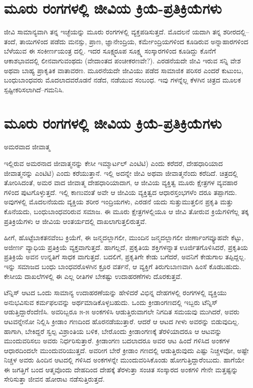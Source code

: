 \section{ಮೂರು ರಂಗಗಳಲ್ಲಿ ಜೀವಿಯ ಕ್ರಿಯೆ-ಪ್ರತಿಕ್ರಿಯೆಗಳು}

ಜೀವಿ ಸಾಮಾನ್ಯವಾಗಿ ತನ್ನ ಇಚ್ಛೆಯನ್ನು ಮೂರು ರಂಗಗಳಲ್ಲಿ ವ್ಯಕ್ತಪಡಿಸುತ್ತದೆ. ಮೊದಲನೆ ಯದಾಗಿ ತನ್ನ ಶರೀರದಲ್ಲಿ–ತಂದೆ, ತಾಯಿಗಳಿಂದ ಪಡೆದು ಮನಸ್ಸು, ಪ್ರಾಣ, ಜ್ಞಾನೇಂದ್ರಿಯ, ಕರ್ಮೇಂದ್ರಿಯಗಳಿಂದ ಕೂಡಿರುವ ಅನ್ನಾಹಾರಗಳಿಂದ ಬೆಳೆಯುವ ಈ ಸಂಕೀರ್ಣಯಂತ್ರ ದಲ್ಲಿ. ಇದರ ಸೂಕ್ಷ್ಮರೂಪ ಸೂಕ್ಷ್ಮ ಸಂಸ್ಕಾರಗಳಿಂದ ಕೂಡಿದ್ದು ಕೊನೆಗೆ ಆಕಾಶಭಾವದಲ್ಲಿ ಲೀನವಾಗುವಂಥದು (ವೇದಾಂತದ ಪಂಚೀಕರಣವೇ?). ಎರಡನೆಯದೇ ಜೀವಿ ಇರುವ ಸನ್ನಿ ವೇಶ ಅಥವಾ ಬಾಹ್ಯ ಪ್ರಾಕೃತಿಕ ವಾತಾವರಣ. ಮೂರನೆಯದೇ ಜೀವಿಯು ಪಡೆದ ಸಾಮಾಜಿಕ ಪರಿಸರ ಎಂದರೆ ಕುಟುಂಬ, ಬಂಧುಬಾಂಧವರು ಮೊದಲಾದವರೊಡನೆ ನಡೆದ, ನಡೆಯುವ ಸಂಬಂಧ. ಇವು ಗಳನ್ನೆಲ್ಲ ಕೆಳಗಿನ ಚಿತ್ರದ ಮೂಲಕ ಸ್ಪಷ್ಟೀಕರಿಸಲಾಗಿದೆ–ಗಮನಿಸಿ.


\section{ಮೂರು ರಂಗಗಳಲ್ಲಿ ಜೀವಿಯ ಕ್ರಿಯೆ-ಪ್ರತಿಕ್ರಿಯೆಗಳು}

ಅಮರವಾದ ಜೀವಾತ್ಮ 

ಇಲ್ಲಿರುವ ಅಮರನಾದ ಜೀವಾತ್ಮನನ್ನು ಕೇಸೀ ಇಮ್ಮಾರ್ಟಲ್ ಎಂಟಿಟಿ) ಎಂದು ಕರೆದರೆ, ದೇಹಧಾರಿಯಾದ ಜೀವಾತ್ಮನನ್ನು ಎಂಟಿಟಿ) ಎಂದು ಕರೆಯುತ್ತಾನೆ. ಇಲ್ಲಿ ಅದನ್ನೇ ಜೀವಿ ಅಥವಾ ಜೀವಾತ್ಮನೆಂದು ಕರೆದಿದೆ. ಚಿತ್ರದಲ್ಲಿ ತೋರಿಸಿದಂತೆ, ಅಮರ ವಾದ ಜೀವಾತ್ಮ ದೇಹಧಾರಿಯಾದಾಗ, ಆ ಜೀವಿಯ ವ್ಯಕ್ತಿತ್ವ ಮೂರು ಕ್ಷೇತ್ರಗಳ ವ್ಯವಹಾರ ಗಳಿಂದ ಪುಟಗೊಳ್ಳುತ್ತದೆ. ಇಲ್ಲಿ ಕಾಣುವಂತೆ ಅವೇ ಆ ಜೀವಿಯ ವ್ಯಕ್ತಿತ್ವದ ಆಧಾರಸ್ತಂಭಗಳೆಂ ದರೂ ತಪ್ಪಾಗದು. ಅವುಗಳಲ್ಲಿ ಮೊದಲನೆಯದು ವ್ಯಕ್ತಿಯ ಶರೀರ ಇಂದ್ರಿಯಗಳು, ಎರಡನೆ ಯದು ಸುತ್ತುಮುತ್ತಲಿನ ಪ್ರಕೃತಿ ಮತ್ತು ಕೊನೆಯದು, ಬಂಧುಬಾಂಧವರಿರುವ ಸಮಾಜ. ಈ ಮೂರು ಕ್ಷೇತ್ರಗಳಲ್ಲಿಯೂ ಆ ಜೀವಿ ತೋರುವ ಕ್ರಿಯೆಗಳಿಗೆಲ್ಲ ತಕ್ಕ ಪ್ರತಿಕ್ರಿಯೆಗಳು ಆ ಜೀವಿಯ ಆಂತರ್ಯದಲ್ಲಿ ದಾಖಲಾಗುತ್ತಲಿರುತ್ತವೆ.

ಹೀಗೆ, ಹೊಟ್ಟೆಬಾಕತನವೆಂಬ ಕ್ರಿಯೆಗೆ, ಈ ಜನ್ಮದಲ್ಲಾಗಲೀ, ಮುಂದಿನ ಜನ್ಮದಲ್ಲಾಗಲೀ ಜೀರ್ಣಾಂಗವ್ಯೂಹವೇ ಕೆಟ್ಟು, ಅಜೀರ್ಣ ವ್ಯಾಧಿಯ ಪ್ರತಿಕ್ರಿಯೆ ವ್ಯಕ್ತವಾಗುತ್ತದೆ. ಹಾಗಲ್ಲದೆ, ಪ್ರಕೃತಿಯ ಶಕ್ತಿಗಳನ್ನಾತ ಊರ್ಜಿತಗೊಳಿಸಿದರೆ, ಪ್ರಕೃತಿಯ ಪ್ರತಿಕ್ರಿಯೆ ಅವನ ಉನ್ನತಿಗೆ ಸಾಧಕ ವಾಗುತ್ತದೆ. ಬದಲಿಗೆ, ಪ್ರಕೃತಿಗೇ ಕೇಡು ಬಗೆದರೆ, ಅವನಿಗೆ ಕೇಡುಗಾಲ ತಪ್ಪಿದ್ದಲ್ಲ. ಇನ್ನು ಸಮಾಜದ ಬಂಧು ಬಾಂಧವರೊಳಗಿನ ಕ್ರೂರ ವರ್ತನೆ, ಆ ವ್ಯಕ್ತಿಗೆ ತಿರುಗುಬಾಣವಾಗಿ ಹಿಂಸೆ ಕೊಡಬಹುದು. ಕೇಸೀಯ ದಾಖಲೆಗಳಲ್ಲಿ ಈ ಎಲ್ಲ ರೀತಿಗಳ ಬೇಕಷ್ಟು ಉದಾಹರಣೆಗಳು ದೊರಕುತ್ತವೆ.

ಟೆನ್ನಿಸ್ ಆಟದ ಒಂದು ಸಾಮಾನ್ಯ ಉದಾಹರಣೆಯನ್ನು ಹೇಳಿದರೆ ವಿಭಿನ್ನ ದೇಹಗಳಲ್ಲಿ ರಂಗಗಳಲ್ಲಿ ವ್ಯಕ್ತಿಯು ಅನುಭವಿಸುವ ಕರ್ಮಫಲವನ್ನು ಅರ್ಥಮಾಡಿಕೊಳ್ಳಬಹುದು. ಒಂದು ಕ್ರೀಡಾಂಗಣದಲ್ಲಿ ಇಬ್ಬರು ಟೆನ್ನಿಸ್ ಆಡುತ್ತಿದ್ದಾರೆಂದೆಣಿಸಿ. ಅವರಿಬ್ಬರೂ ೫-೫ ಅಂಕಗಳಿಸಿ ಆಡುತ್ತಿರುವಾಗಲೇ ನಿಗದಿತ ಸಮಯವು ಮುಗಿದರೆ, ಅವರು ಆಟವನ್ನೇನೋ ನಿಲ್ಲಿಸಿ ಕ್ರೀಡಾಂ ಗಣದಿಂದ ಹೊರನಡೆಯುತ್ತಾರೆ. ಆದರೆ ಆ ಆಟದ ಗೀಳು ಅವರನ್ನು ಬಿಡುವುದಿಲ್ಲ. ಹಾಗಾಗಿ, ಬೇಕಿದ್ದರೆ ಸ್ವಲ್ಪ ವಿಶ್ರಾಂತಿಯ ಬಳಿಕ, ಬೇರೊಂದು ಕ್ರೀಡಾಂಗಣಕ್ಕೆ ತೆರಳಿಯಾದರೂ ಆ ಆಟವನ್ನು ಮುಂದುವರಿಸಲು ಅವರು ನಿರ್ಧರಿಸುತ್ತಾರೆ. ಕ್ರೀಡಾಂಗಣ ಬದಲಾದರೂ ಅವರ ಆಟ ಹಿಂದೆ ಗಳಿಸಿದ ಅಂಕಗಳ ಆಧಾರದಿಂದಲೇ ಮುಂದುವರಿಯುತ್ತದೆ. ಅವರೀಗ ಬೇರೆ ಕ್ರೀಡಾಂ ಗಣದಲ್ಲಿ ಆಡುತ್ತಿರುವುದು ಎಷ್ಟು ನಿಚ್ಚಳವೋ, ಅಷ್ಟೇ ನಿಚ್ಚಳ ಅವರು ಹಿಂದಿನ ಆಟದಲ್ಲಿ ಗಳಿಸಿದ ಅಂಕಗಳನ್ನೇ ಮುಂದುವರಿಸಿಕೊಂಡು ಹೋಗುತ್ತಿದ್ದಾರೆಂಬುದು. ಹಾಗೆಯೇ ಈ ಜಗತ್ತಿಗೆ ಬಂದ ಆತ್ಮವೊಂದು ದೇಹದಿಂದ ದೇಹಕ್ಕೆ ತೆರಳುತ್ತಾ ಸಂಚಿತ ಸಂಸ್ಕಾರದ ಅಂಕಗಳಿ ಗೇನೇ ಮತ್ತಷ್ಟನ್ನು ಸೇರಿಸುತ್ತಾ ಜೀವನ ಹೋರಾಟ ನಡೆಸುತ್ತಿರುತ್ತದೆ.


